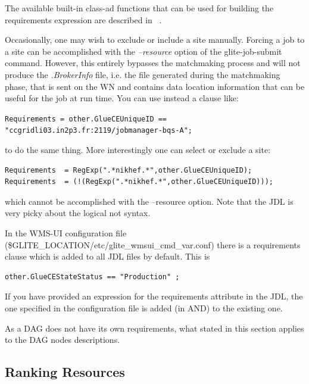 The available built-in class-ad functions that can be used for building the requirements expression are 
described in ~\cite{jdl-lang}.

Occasionally, one may wish to exclude or include a site manually. Forcing a job to a site can be 
accomplished with the \emph{--resource} option of the glite-job-submit command. However, this 
entirely bypasses the matchmaking process and will not produce the \emph{.BrokerInfo} file, i.e. the 
file generated during the matchmaking phase, that is sent on the WN and contains data location 
information that can be useful for the job at run time. You can use instead a clause like:

\smallskip
{\scriptsize{
\verb!Requirements = other.GlueCEUniqueID == "ccgridli03.in2p3.fr:2119/jobmanager-bqs-A";!
}}
\smallskip
  
to do the same thing. More interestingly one can select or exclude a site:

\smallskip
\begin{scriptsize}
\begin{verbatim}   
Requirements  = RegExp(".*nikhef.*",other.GlueCEUniqueID);
Requirements  = (!(RegExp(".*nikhef.*",other.GlueCEUniqueID)));
\end{verbatim}
\end{scriptsize}
\smallskip


which cannot be accomplished with the --resource option. Note that the JDL is very picky about the 
logical not syntax. 

In the WMS-UI configuration file (\$GLITE\_LOCATION/etc/glite\_wmsui\_cmd\_var.conf) there is a 
requirements clause which is added to all JDL files by default. This is 

\smallskip
\begin{scriptsize}
\begin{verbatim}   
other.GlueCEStateStatus == "Production" ;
\end{verbatim}
\end{scriptsize}
\smallskip

If you have provided an expression for the requirements attribute in the JDL, the one specified in 
the configuration file is added (in AND) to the existing one. 

As a DAG does not have its own requirements, what stated in this section applies to the DAG nodes descriptions. 



\subsection{Ranking Resources}

